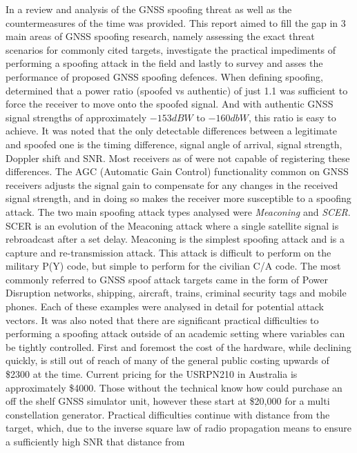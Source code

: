 In \textcite{RN32} a review and analysis of the GNSS spoofing threat as well as the countermeasures of the time was provided. This report aimed
to fill the gap in 3 main areas of GNSS spoofing research, namely assessing the exact threat scenarios for commonly cited targets, investigate the practical impediments
of performing a spoofing attack in the field and lastly to survey and asses the performance of proposed GNSS spoofing defences. When defining spoofing, \citeauthor{RN32}
determined that a power ratio (spoofed vs authentic) of just 1.1 was sufficient to force the receiver to move onto the spoofed signal. And with authentic GNSS signal
strengths of approximately $-153dBW$ to $-160dbW$, this ratio is easy to achieve. It was noted that the
only detectable differences between a legitimate and spoofed one is the timing difference, signal angle of arrival, signal strength, Doppler shift and SNR. Most receivers
as of \citeyear{RN32} were not capable of registering these differences. The AGC (Automatic Gain Control) functionality common on GNSS receivers adjusts the signal gain
to compensate for any changes in the received signal strength, and in doing so makes the receiver more susceptible to a spoofing attack. The two main spoofing attack
types analysed were \emph{Meaconing} and \emph{SCER}. SCER is an evolution of the Meaconing attack where a single satellite signal is rebroadcast after a set delay.
Meaconing is the simplest spoofing attack and is a capture and re-transmission attack. This attack is difficult to perform on the military P(Y) code, but simple to perform
for the civilian C/A code. The most commonly referred to GNSS spoof attack targets came in the form of Power Disruption networks, shipping, aircraft, trains, criminal
security tags and mobile phones. Each of these examples were analysed in detail for potential attack vectors.
It was also noted that there are significant practical difficulties to performing a spoofing attack outside of an academic setting where variables can be tightly
controlled. First and foremost the cost of the hardware, while declining quickly, is still out of reach of many of the general public costing upwards of \$2300 at the
time. Current pricing for the USRPN210 in Australia is approximately \$4000. 
Those without the technical know how could purchase an off the shelf GNSS simulator unit, however these start at \$20,000 for a multi constellation generator. Practical
difficulties continue with distance from the target, which, due to the inverse square law of radio propagation means to ensure a sufficiently high SNR that distance from
